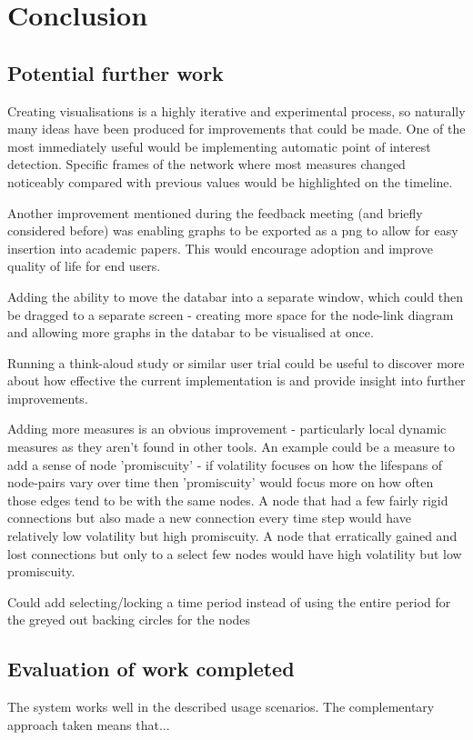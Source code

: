 \chapter{Conclusion}

\section{Potential further work} 
Creating visualisations is a highly iterative and experimental process, so naturally many ideas have been produced for improvements that could be made. 
One of the most immediately useful would be implementing automatic point of interest detection. Specific frames of the network where most measures changed noticeably compared with previous values would be highlighted on the timeline.
\newline

Another improvement mentioned during the feedback meeting (and briefly considered before) was enabling graphs to be exported as a png to allow for easy insertion into academic papers. This would encourage adoption and improve quality of life for end users.
\newline

Adding the ability to move the databar into a separate window, which could then be dragged to a separate screen - creating more space for the node-link diagram and allowing more graphs in the databar to be visualised at once. 
\newline

Running a think-aloud study or similar user trial could be useful to discover more about how effective the current implementation is and provide insight into further improvements.
\newline

Adding more measures is an obvious improvement - particularly local dynamic measures as they aren't found in other tools. An example could be a measure to add a sense of node 'promiscuity' - if volatility focuses on how the lifespans of node-pairs vary over time then 'promiscuity' would focus more on how often those edges tend to be with the same nodes. A node that had a few fairly rigid connections but also made a new connection every time step would have relatively low volatility but high promiscuity. A node that erratically gained and lost connections but only to a select few nodes would have high volatility but low promiscuity.

Could add selecting/locking a time period instead of using the entire period for the greyed out backing circles for the nodes

\section{Evaluation of work completed} 
The system works well in the described usage scenarios. The complementary approach taken means that...
